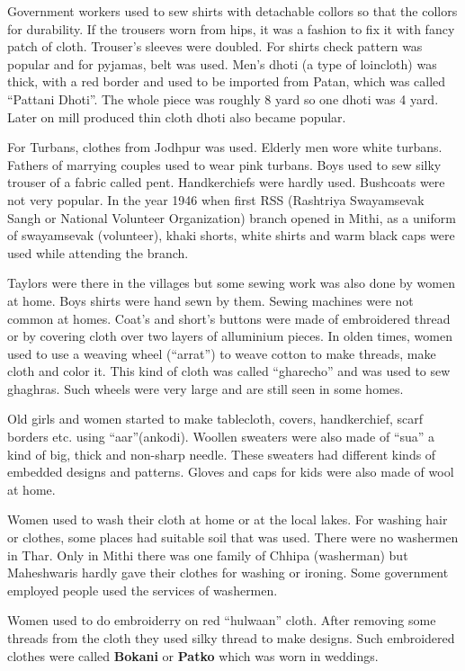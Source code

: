Government workers used to sew shirts with detachable collors so that the collors for durability. If the trousers worn from hips, it was a fashion to fix it with fancy patch of cloth. Trouser's sleeves were doubled. For shirts check pattern was popular and for pyjamas, belt was used. Men's dhoti (a type of loincloth) was thick, with a red border and used to be imported from Patan, which was called ``Pattani Dhoti''. The whole piece was roughly 8 yard so one dhoti was 4 yard. Later on mill produced thin cloth dhoti also became popular.

For Turbans, clothes from Jodhpur was used. Elderly men wore white turbans. Fathers of marrying couples used to wear pink turbans. Boys used to sew silky trouser of a fabric called pent. Handkerchiefs were hardly used. Bushcoats were not very popular. In the year 1946 when first RSS (Rashtriya Swayamsevak Sangh or National Volunteer Organization) branch opened in Mithi, as a uniform of swayamsevak (volunteer), khaki shorts, white shirts and warm black caps were used while attending the branch.

Taylors were there in the villages but some sewing work was also done by women at home. Boys shirts were hand sewn by them. Sewing machines were not common at homes. Coat's and short's buttons were made of embroidered thread or by covering cloth over two layers of alluminium pieces. In olden times, women used to use a weaving wheel (``arrat'') to weave cotton to make threads, make cloth and color it. This kind of cloth was called ``gharecho'' and was used to sew ghaghras. Such wheels were very large and are still seen in some homes.

Old girls and women started to make tablecloth, covers, handkerchief, scarf borders etc. using ``aar''(ankodi). Woollen sweaters were also made of ``sua'' a kind of big, thick and non-sharp needle. These sweaters had different kinds of embedded designs and patterns. Gloves and caps for kids were also made of wool at home.

Women used to wash their cloth at home or at the local lakes. For washing hair or clothes, some places had suitable soil that was used. There were no washermen in Thar. Only in Mithi there was one family of Chhipa (washerman) but Maheshwaris hardly gave their clothes for washing or ironing. Some government employed people used the services of washermen.

Women used to do embroiderry on red ``hulwaan'' cloth. After removing some threads from the cloth they used silky thread to make designs. Such embroidered clothes were called \textbf{Bokani} or \textbf{Patko} which was worn in weddings.

